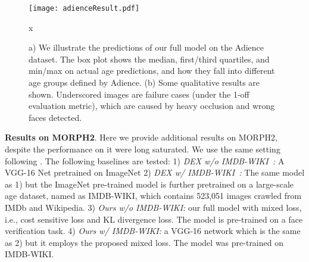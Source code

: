 \documentclass{bmvc2k}
\begin{document}
\begin{figure}[t]
\begin{center}
   \texttt{[image: adienceResult.pdf]}
\end{center}x
\vskip -0.8cm
   \caption{a) We illustrate the predictions of our full model on the Adience dataset. The box plot shows the median, first/third quartiles, and min/max on actual age predictions, and how they fall into different age groups defined by Adience. (b) Some qualitative results are shown. Underscored images are failure cases (under the 1-off evaluation metric), which are caused by heavy occlusion and wrong faces detected.}
\label{fig:resultAdience}
\end{figure}

\noindent
\textbf{Results on MORPH2}.
Here we provide additional results on MORPH2, despite the performance on it were long saturated. We use the same setting following \cite{rothe2016deep}. The following baselines are tested:
1) \textsl{DEX w/o IMDB-WIKI~\cite{rothe2016deep}:} A VGG-16 Net pretrained on ImageNet 
2) \textsl{DEX w/ IMDB-WIKI~\cite{rothe2016deep}:} The same model as 1) but the ImageNet pre-trained model is further pretrained on a large-scale age dataset, named as IMDB-WIKI, which contains 523,051 images crawled from IMDb and Wikipedia. 
3) \textsl{Ours w/o IMDB-WIKI:} our full model with mixed loss, i.e., cost sensitive loss and KL divergence loss. The model is pre-trained on a face verification task.
4) \textsl{Ours w/ IMDB-WIKI:} a VGG-16 network which is the same as 2) but it employs the proposed mixed loss. The model was pre-trained on IMDB-WIKI. 
\end{document}
